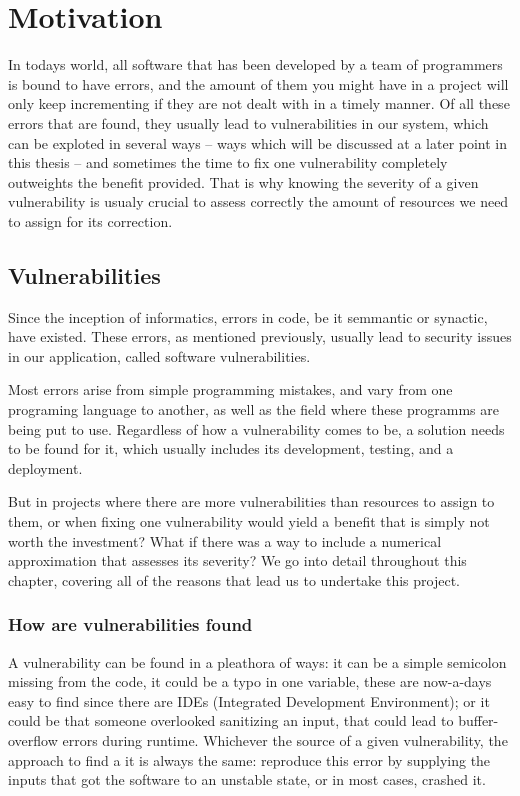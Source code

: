 
\chapter{Motivation}\label{chapter:Motivation}

In todays world, all software that has been developed by a team of programmers is bound to have errors, and the amount of them you might have in a project will only keep incrementing if they are not dealt with in a timely manner. Of all these errors that are found, they usually lead to vulnerabilities in our system, which can be exploted in several ways -- ways which will be discussed at a later point in this thesis -- and sometimes the time to fix one vulnerability completely outweights the benefit provided. That is why knowing the severity of a given vulnerability is usualy crucial to assess correctly the amount of resources we need to assign for its correction.

\section{Vulnerabilities}
Since the inception of informatics, errors in code, be it semmantic or synactic, have existed. These errors, as mentioned previously, usually lead to security issues in our application, called software vulnerabilities.

Most errors arise from simple programming mistakes, and vary from one programing language to another, as well as the field where these programms are being put to use. Regardless of how a vulnerability comes to be, a solution needs to be found for it, which usually includes its development, testing, and a deployment.

But in projects where there are more vulnerabilities than resources to assign to them, or when fixing one vulnerability would yield a benefit that is simply not worth the investment? What if there was a way to include a numerical approximation that assesses its severity? We go into detail throughout this chapter, covering all of the reasons that lead us to undertake this project.

\subsection{How are vulnerabilities found}

A vulnerability can be found in a pleathora of ways: it can be a simple semicolon missing from the code, it could be a typo in one variable, these are now-a-days easy to find since there are IDEs (Integrated Development Environment); or it could be that someone overlooked sanitizing an input, that could lead to buffer-overflow errors during runtime. Whichever the source of a given vulnerability, the approach to find a it is always the same: reproduce this error by supplying the inputs that got the software to an unstable state, or in most cases, crashed it.

